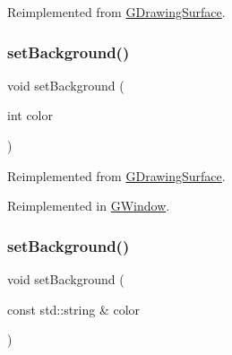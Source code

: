 Reimplemented from \mbox{\hyperlink{classGDrawingSurface_adf10848319457bd6df4c657bf8872bee}{G\+Drawing\+Surface}}.

\mbox{\label{classGForwardDrawingSurface_a427fefbbc34e39e5df27a807da488e0d}} 
\subsubsection{\texorpdfstring{set\+Background()}{setBackground()}\hspace{0.1cm}{\footnotesize\ttfamily [1/2]}}
{\footnotesize\ttfamily void set\+Background (\begin{DoxyParamCaption}\item[{int}]{color }\end{DoxyParamCaption})\hspace{0.3cm}{\ttfamily [virtual]}}



Reimplemented from \mbox{\hyperlink{classGDrawingSurface_aba673fd56570a074aba10fa059524b96}{G\+Drawing\+Surface}}.



Reimplemented in \mbox{\hyperlink{classGWindow_a427fefbbc34e39e5df27a807da488e0d}{G\+Window}}.

\mbox{\label{classGForwardDrawingSurface_a222fcfb542aa6094c7e0de671bd69627}} 
\subsubsection{\texorpdfstring{set\+Background()}{setBackground()}\hspace{0.1cm}{\footnotesize\ttfamily [2/2]}}
{\footnotesize\ttfamily void set\+Background (\begin{DoxyParamCaption}\item[{const std\+::string \&}]{color }\end{DoxyParamCaption})\hspace{0.3cm}{\ttfamily [virtual]}}




